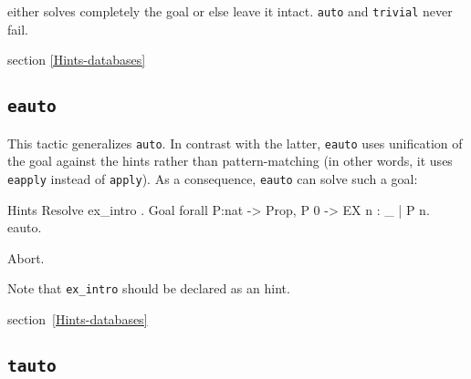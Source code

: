  either solves completely the goal or else leave it
intact. \texttt{auto} and \texttt{trivial} never fail.

\SeeAlso section \ref{Hints-databases}

\subsection{\tt eauto}\label{eauto}

This tactic generalizes {\tt auto}. In contrast with 
the latter, {\tt eauto} uses unification of the goal
against the hints rather than pattern-matching
(in other words, it uses {\tt eapply} instead of
{\tt apply}).
As a consequence, {\tt eauto} can solve such a goal:

\begin{coq_example}
Hints Resolve ex_intro .
Goal forall P:nat -> Prop, P 0 ->  EX n : _ | P n.
eauto.
\end{coq_example}
\begin{coq_eval}
Abort.
\end{coq_eval}

Note that {\tt ex\_intro} should be declared as an
hint.

\SeeAlso section~\ref{Hints-databases}

% 


\subsection{\tt tauto}
\label{tauto}

